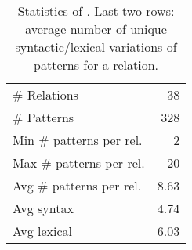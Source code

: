 \begin{table}[t]
    \centering
\begin{tabular}{lr}
  \toprule
    \# Relations &   38 \\
    \# Patterns & 328 \\
    \midrule
 Min \# patterns per rel. &    2 \\
 Max \# patterns per rel. &   20 \\
 Avg \# patterns per rel. &    8.63 \\
 \midrule
   Avg syntax  &    4.74 \\
  Avg lexical  &    6.03 \\
\bottomrule
\end{tabular}
    \caption{Statistics of \resource{}. 
    Last two rows: average number of unique
    syntactic/lexical variations of patterns for a relation.}
    \label{tab:rel-graph-stats}
    
    \vspace{-0.1in}
\end{table}
